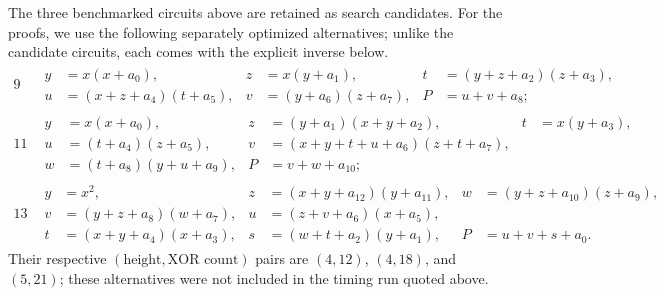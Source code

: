 \medskip
\noindent
The three benchmarked circuits above are retained as search candidates.  For
the proofs, we use the following separately optimized alternatives; unlike the
candidate circuits, each comes with the explicit inverse below.
\[
\begin{array}{c|l}
9 &
\begin{aligned}
y&=x(x+a_0),& z&=x(y+a_1),& t&=(y+z+a_2)(z+a_3),\\
u&=(x+z+a_4)(t+a_5),& v&=(y+a_6)(z+a_7),& P&=u+v+a_8;
\end{aligned}\\[2ex]
11 &
\begin{aligned}
y&=x(x+a_0),& z&=(y+a_1)(x+y+a_2),& t&=x(y+a_3),\\
u&=(t+a_4)(z+a_5),&v&=(x+y+t+u+a_6)(z+t+a_7),\\
w&=(t+a_8)(y+u+a_9),&P&=v+w+a_{10};
\end{aligned}\\[2ex]
13 &
\begin{aligned}
y&=x^2,&z&=(x+y+a_{12})(y+a_{11}),&w&=(y+z+a_{10})(z+a_9),\\
v&=(y+z+a_8)(w+a_7),&u&=(z+v+a_6)(x+a_5),\\
t&=(x+y+a_4)(x+a_3),&s&=(w+t+a_2)(y+a_1),&P&=u+v+s+a_0.
\end{aligned}
\end{array}                                                     \tag{A.0}
\]
Their respective $(\text{height},\text{XOR count})$ pairs are
$(4,12)$, $(4,18)$, and $(5,21)$; these alternatives were not included in
the timing run quoted above.

